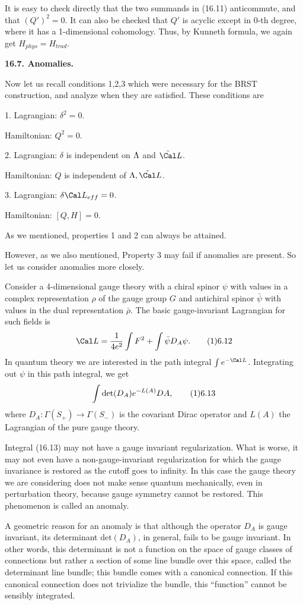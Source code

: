 It is easy to check directly that the two summands in (16.11) anticommute, 
and that $(Q')^2=0$. It can also be checked that $Q'$ is acyclic except 
in 0-th degree, where it has a 1-dimensional cohomology. Thus, by Kunneth 
formula, we again get $H_{phys}=H_{trad}$. 

{\bf 16.7. Anomalies.}

Now let us recall conditions 1,2,3 which were necessary for the BRST 
construction, and analyze when they are satisfied. These conditions 
are

1. Lagrangian: $\delta^2=0$.

   Hamiltonian: $Q^2=0$.   

2. Lagrangian: $\delta$ is independent on $\Lambda$ and $\tilde\Cal L$.

   Hamiltonian: $Q$ is independent of $\L,\tilde\Cal L$.   

3. Lagrangian: $\delta \Cal L_{eff}=0$.

   Hamiltonian: $[Q,H]=0$. 

As we mentioned, properties 1 and 2 can always be attained. 

However, as we also mentioned, Property 3 may fail
if anomalies are present. So let us consider anomalies more closely. 

Consider a 4-dimensional gauge theory with a chiral spinor $\psi$
with values in a complex representation $\rho$ of the gauge group $G$ and 
antichiral spinor $\bar \psi$ with values in the dual representation 
$\bar\rho$. The basic gauge-invariant Lagrangian for such fields is
$$
\Cal L=\frac{1}{4e^2}\int F^2+\int \bar\psi D_A\psi.\tag 16.12
$$
In quantum theory we are interested in the path integral $\int e^{-\Cal L}$. 
Integrating out $\psi$ in this path integral, we get 
$$
\int \text{det}(D_A)e^{-L(A)}DA, \tag 16.13
$$
where $D_A:\Gamma(S_+)\to \Gamma(S_-)$ is the covariant 
Dirac operator and $L(A)$ the Lagrangian of the pure gauge theory. 

Integral (16.13) may not have a gauge invariant regularization. What is 
worse, it may not even have a non-gauge-invariant  
regularization for which the gauge invariance
is restored as the cutoff goes to infinity. In this case the gauge theory  
we are considering does not make sense quantum mechanically, even 
in perturbation theory, because gauge symmetry cannot be restored. 
This phenomenon is called an anomaly. 

A geometric reason for an anomaly is that although 
the operator $D_A$ is gauge invariant, 
its determinant $\text{det}(D_A)$, in general, fails to be 
gauge invariant. In other words, this determinant is  
not a function on the space of gauge classes of connections 
but rather a section of some line bundle over this 
space, called the determinant line bundle; this bundle 
comes with a canonical connection. If this canonical 
connection does not trivialize 
the bundle, this ``function'' cannot be sensibly integrated. 

